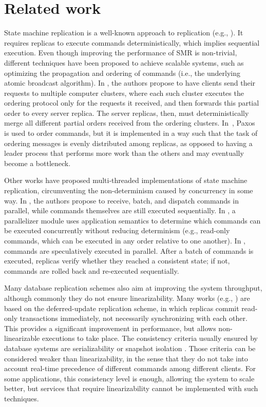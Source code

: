 \section{Related work}
\label{sec:rw}

State machine replication is a well-known approach to replication (e.g., \cite{Lam78, Sch90, Kapritsos:2012um, kotla2004htbft, santos2013htsmr}).
It requires replicas to execute commands deterministically, which implies sequential execution.
Even though improving the performance of SMR is non-trivial, different techniques have been proposed to achieve scalable systems, such as optimizing the propagation and ordering of commands (i.e., the underlying atomic broadcast algorithm).
In \cite{kapritsos2010scalable}, the authors propose to have clients send their requests to multiple computer clusters, where each such cluster executes the ordering protocol only for the requests it received, and then forwards this partial order to every server replica.
The server replicas, then, must deterministically merge all different partial orders received from the ordering clusters.
In~\cite{biely2012spaxos}, Paxos~\cite{Lamport:1998ea} is used to order commands, but it is implemented in a way such that the task of ordering messages is evenly distributed among replicas, as opposed to having a leader process that performs more work than the others and may eventually become a bottleneck. 

Other works have proposed multi-threaded implementations of state machine replication, circumventing the non-determinism caused by concurrency in some way. 
In \cite{santos2013htsmr}, the authors propose to receive, batch, and dispatch commands in parallel, while commands themselves are still executed sequentially.
In \cite{kotla2004htbft}, a parallelizer module uses application semantics to determine which commands can be executed concurrently without reducing determinism (e.g., read-only commands, which can be executed in any order relative to one another).
In \cite{Kapritsos:2012um}, commands are speculatively executed in parallel.
After a batch of commands is executed, replicas verify whether they reached a consistent state; if not, commands are rolled back and re-executed sequentially. 

Many database replication schemes also aim at improving the system throughput, although commonly they do not ensure linearizability. Many works (e.g., \cite{sciascia2012sdur, chundi96dur, kobus2013hybrid, SousaOMP01}) are based on the deferred-update replication scheme, in which replicas commit read-only transactions immediately, not necessarily synchronizing with each other. This provides a significant improvement in performance, but allows non-linearizable executions to take place. The consistency criteria usually ensured by database systems are serializability \cite{BHG87} or snapshot isolation \cite{LinKJPA09}. Those criteria can be considered weaker than linearizability, in the sense that they do not take into account real-time precedence of different commands among different clients. 
For some applications, this consistency level is enough, allowing the system to scale better, but services that require linearizability cannot be implemented with such techniques.

